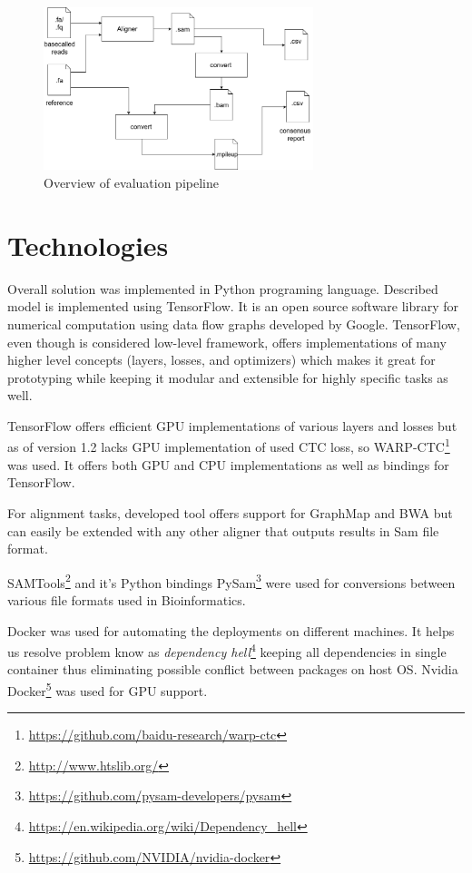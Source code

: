 \documentclass[times, utf8, diplomski, numeric, english]{fer}
\begin{document}
\begin{figure}[!ht]
	\begin{center}
		\includegraphics[width=0.7\textwidth]{./imgs/evaluation_pipeline.png}
		\caption{Overview of evaluation pipeline}
		\label{fg:eval_pipe}
	\end{center}
\end{figure}

\section{Technologies}

Overall solution was implemented in Python programing language. Described model is implemented using TensorFlow. It is an open source software library for numerical computation using data flow graphs developed by Google. TensorFlow, even though is considered low-level framework, offers implementations of many higher level concepts (layers, losses, and optimizers) which makes it great for prototyping while keeping it modular and extensible for highly specific tasks as well.

TensorFlow offers efficient GPU implementations of various layers and losses but as of version 1.2 lacks GPU implementation of used CTC loss, so WARP-CTC\footnote{\url{https://github.com/baidu-research/warp-ctc}} was used. It offers both GPU and CPU implementations as well as bindings for TensorFlow.

For alignment tasks, developed tool offers support for GraphMap and BWA but can easily be extended with any other aligner that outputs results in Sam file format.

SAMTools\footnote{\url{http://www.htslib.org/}} and it's Python bindings PySam\footnote{\url{https://github.com/pysam-developers/pysam}} were used for conversions between various file formats used in Bioinformatics.

Docker was used for automating the deployments on different machines. It helps us resolve problem know as \textit{dependency hell}\footnote{\url{https://en.wikipedia.org/wiki/Dependency_hell}}  keeping all dependencies in single container thus eliminating possible conflict between packages on host OS.
Nvidia Docker\footnote{\url{https://github.com/NVIDIA/nvidia-docker}} was used for GPU support.
\end{document}
